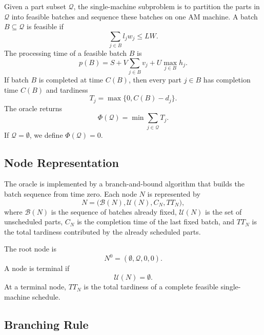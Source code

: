 \documentclass[letterpaper, 10 pt, conference]{ieeeconf}  %
\begin{document}
Given a part subset $\mathcal{Q}$, the single-machine subproblem is to
partition the parts in $\mathcal{Q}$ into feasible batches and sequence
these batches on one AM machine. A batch $B\subseteq \mathcal{Q}$ is feasible
if
\begin{equation}
	\sum_{j\in B} l_j w_j \le LW.
\end{equation}
The processing time of a feasible batch $B$ is
\begin{equation}
	p(B)
	=
	S
	+
	V\sum_{j\in B}v_j
	+
	U\max_{j\in B}h_j .
	\label{eq:oracle_batch_processing_time}
\end{equation}
If batch $B$ is completed at time $C(B)$, then every part $j\in B$ has
completion time $C(B)$ and tardiness
\begin{equation}
	T_j=\max\{0,C(B)-d_j\}.
\end{equation}
The oracle returns
\begin{equation}
	\Phi(\mathcal{Q})
	=
	\min
	\sum_{j\in \mathcal{Q}} T_j .
\end{equation}
If $\mathcal{Q}=\emptyset$, we define $\Phi(\mathcal{Q})=0$.

\subsection{Node Representation}

The oracle is implemented by a branch-and-bound algorithm that builds the
batch sequence from time zero. Each node $N$ is represented by
\begin{equation}
	N=
	\bigl(
	\mathcal{B}(N),\mathcal{U}(N),C_N,TT_N
	\bigr),
\end{equation}
where $\mathcal{B}(N)$ is the sequence of batches already fixed,
$\mathcal{U}(N)$ is the set of unscheduled parts, $C_N$ is the completion
time of the last fixed batch, and $TT_N$ is the total tardiness contributed
by the already scheduled parts.

The root node is
\begin{equation}
	N^0=(\emptyset,\mathcal{Q},0,0).
\end{equation}
A node is terminal if
\begin{equation}
	\mathcal{U}(N)=\emptyset .
\end{equation}
At a terminal node, $TT_N$ is the total tardiness of a complete feasible
single-machine schedule.

\subsection{Branching Rule}
\end{document}

